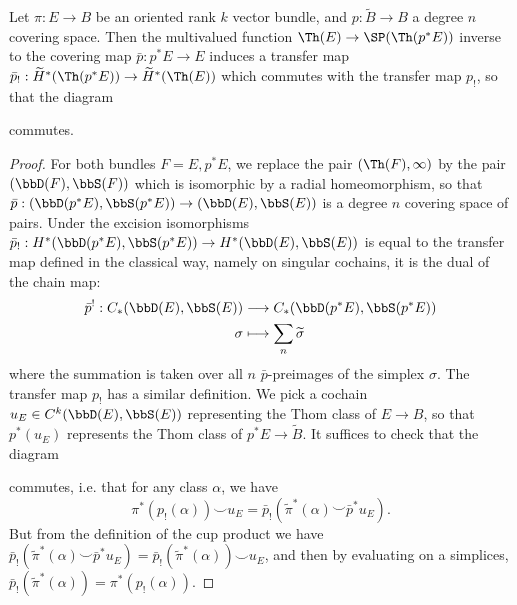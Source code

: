 \begin{lemma}\label{lem:thomandtransfer}
    Let $\pi:E\to B$ be an oriented rank $k$ vector bundle, and $p:\widetilde{B}\to B$ a degree $n$ covering space. Then the multivalued function $\Th(E)\to \SP(\Th(p^*E))$ inverse to the covering map $\bar{p}:p^*E\to E$ induces a transfer map $\bar{p}_!:\widetilde{H}^*(\Th(p^*E))\to \widetilde{H}^*(\Th(E))$ which commutes with the transfer map $p_!$, so that the diagram
    \begin{center}
    \end{center}
    commutes.
\end{lemma}
\begin{proof}
    For both bundles $F=E, p^*E$, we replace the pair $(\Th(F),\infty)$ by the pair $(\bbD(F),\bbS(F))$ which is isomorphic by a radial homeomorphism, so that $\bar{p}:(\bbD(p^*E),\bbS(p^*E))\to (\bbD(E),\bbS(E))$ is a degree $n$ covering space of pairs. Under the excision isomorphisms $\bar{p}_!:H^*(\bbD(p^*E),\bbS(p^*E))\to H^*(\bbD(E),\bbS(E))$ is equal to the transfer map defined in the classical way, namely on singular cochains, it is the dual of the chain map: \begin{align*}
        \bar{p}^!:C_*(\bbD(E),\bbS(E))&\longrightarrow C_*(\bbD(p^*E),\bbS(p^*E))\\
        \sigma &\longmapsto \sum_n \widetilde{\sigma}
    \end{align*}
    where the summation is taken over all $n$ $\bar{p}$-preimages of the simplex $\sigma$. The transfer map $p_!$ has a similar definition. We pick a cochain $u_E\in C^k(\bbD(E),\bbS(E))$ representing the Thom class of $E\to B$, so that $p^*(u_E)$ represents the Thom class of $p^*E\to \widetilde{B}$. It suffices to check that the diagram
    \begin{center}
    \end{center}
    commutes, i.e. that for any class $\alpha$, we have $$\pi^*(p_!(\alpha))\smile u_E=\bar{p}_!(\widetilde{\pi}^*(\alpha)\smile \bar{p}^*u_E).$$
    But from the definition of the cup product we have $\bar{p}_!(\widetilde{\pi}^*(\alpha)\smile \bar{p}^*u_E)=\bar{p}_!(\widetilde{\pi}^*(\alpha))\smile u_E$, and then by evaluating on a simplices, $\bar{p}_!(\widetilde{\pi}^*(\alpha))=\pi^*(p_!(\alpha))$.    
\end{proof}


